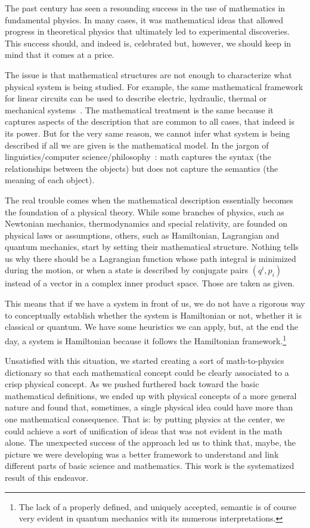 \documentclass[smallextended]{svjour3}
\numberwithin{equation}{section}
\begin{document}
The past century has seen a resounding success in the use of mathematics in fundamental physics. In many cases, it was mathematical ideas that allowed progress in theoretical physics that ultimately led to experimental discoveries. This success should, and indeed is, celebrated but, however, we should keep in mind that it comes at a price.

The issue is that mathematical structures are not enough to characterize what physical system is being studied. For example, the same mathematical framework for linear circuits can be used to describe electric, hydraulic, thermal or mechanical systems~\cite{Roland,Barron,Borutzky}. The mathematical treatment is the same because it captures aspects of the description that are common to all cases, that indeed is its power. But for the very same reason, we cannot infer what system is being described if all we are given is the mathematical model. In the jargon of linguistics/computer science/philosophy~\cite{Freidin,Friedman}: math captures the syntax (the relationships between the objects) but does not capture the semantics (the meaning of each object).

The real trouble comes when the mathematical description essentially becomes the foundation of a physical theory. While some branches of physics, such as Newtonian mechanics, thermodynamics and special relativity, are founded on physical laws or assumptions, others, such as Hamiltonian, Lagrangian and quantum mechanics, start by setting their mathematical structure. Nothing tells us why there should be  a Lagrangian function whose path integral is minimized during the motion, or when a state is described by conjugate pairs $(q^i, p_i)$ instead of a vector in a complex inner product space. Those are taken as given.

This means that if we have a system in front of us, we do not have a rigorous way to conceptually establish whether the system is Hamiltonian or not, whether it is classical or quantum. We have some heuristics we can apply, but, at the end the day, a system is Hamiltonian because it follows the Hamiltonian framework.\footnote{The lack of a properly defined, and uniquely accepted, semantic is of course very evident in quantum mechanics with its numerous interpretations.}

Unsatisfied with this situation, we started creating a sort of math-to-physics dictionary so that each mathematical concept could be clearly associated to a crisp physical concept. As we pushed furthered back toward the basic mathematical definitions, we ended up with physical concepts of a more general nature and found that, sometimes, a single physical idea could have more than one mathematical consequence. That is: by putting physics at the center, we could achieve a sort of unification of ideas that was not evident in the math alone. The unexpected success of the approach led us to think that, maybe, the picture we were developing was a better framework to understand and link different parts of basic science and mathematics. This work is the systematized result of this endeavor.
\end{document}
